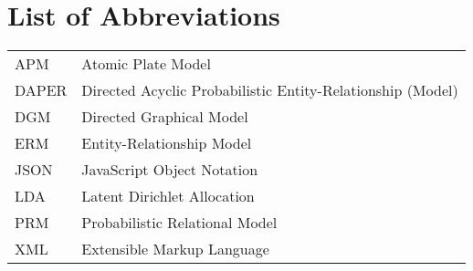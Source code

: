 \section*{List of Abbreviations}

\begin{tabular}{ll}
APM & Atomic Plate Model\\
DAPER & Directed Acyclic Probabilistic Entity-Relationship (Model)\\
DGM & Directed Graphical Model\\
ERM & Entity-Relationship Model\\
JSON & JavaScript Object Notation\\
LDA & Latent Dirichlet Allocation\\
PRM & Probabilistic Relational Model\\
XML & Extensible Markup Language

\end{tabular}
